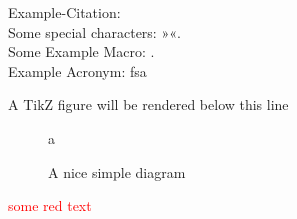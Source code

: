 \documentclass[class=scrbook, crop=false]{standalone}
\begin{document}
Example-Citation:
\cite{DenKr_denkrement1_indeco}
\\%
Some special characters:
»«.
\\%
Some Example Macro:
.
\\%
Example Acronym:
\gls{fsa}

A TikZ figure will be rendered below this line

\begin{figure}[ht]
\centering
a
\label{fig:tikzexample}
\caption{A nice simple diagram}
\end{figure}

\textcolor{red}{some red text}
\end{document}
